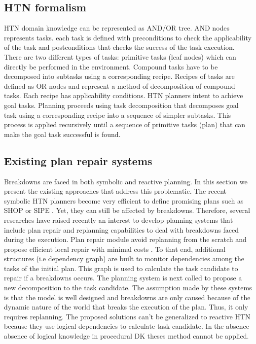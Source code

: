 \documentclass{llncs}
\begin{document}
		\subsection{HTN formalism}
		\par HTN domain knowledge can be represented as AND/OR tree. AND nodes represents tasks. each task is defined with preconditions to check the applicability of the task and postconditions  that checks the success of the task execution. There are two different types of tasks: primitive tasks (leaf nodes) which can directly be performed in the environment. Compound tasks have to be decomposed into subtasks using a corresponding recipe. Recipes of tasks are defined as OR nodes and represent a method of decomposition of compound tasks. Each recipe has  applicability conditions.  HTN planners intent to achieve goal tasks. Planning proceeds using task decomposition that decomposes goal task  using a corresponding recipe into a sequence of simpler subtasks. This process is applied recursively until a sequence of primitive tasks (plan) that can make the goal task successful is found. 

		\subsection{Existing plan repair systems}
		\par Breakdowns are faced in both symbolic and reactive planning. In this section we present the existing approaches that address this problematic. The recent  symbolic HTN planners become very efficient to define promising plans such as SHOP \cite{nau1999shop} or SIPE \cite{wilkins1988practical}. Yet, they can still be affected by breakdowns. Therefore, several researches have raised  recently an interest to develop planning systems that include plan repair  and replanning capabilities to deal with breakdowns faced during the execution. Plan repair module avoid replanning from the scratch and propose efficient local repair with minimal costs \cite{boella2002replanning,van2005plan,ayan2007hotride,warfield2007adaptation}. To that end, additional structures (i.e dependency graph)  are built to monitor dependencies among the tasks of the initial plan. This graph is used to calculate the task candidate to repair if a breakdowns occurs. The planning system is next called to propose a new decomposition to the task candidate. The assumption made by these systems is that the model is well designed and breakdowns are only caused because of the dynamic nature of the world that breaks the execution of the plan. Thus, it only requires replanning. The proposed solutions can't be generalized to reactive HTN because they use logical dependencies to calculate task candidate. In the absence  absence of logical knowledge in procedural DK theses method cannot be applied.
		
\end{document}
